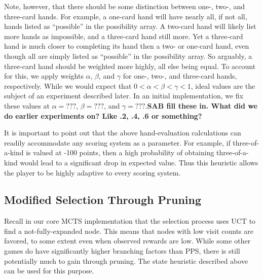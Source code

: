 \documentclass[letterpaper]{article}
\begin{document}
Note, however, that there should be some distinction between one-, two-, and three-card hands. For example, a one-card hand will have nearly all, if not all, hands listed as ``possible'' in the possibility array. A two-card hand will likely list more hands as impossible, and a three-card hand still more. Yet a three-card hand is much closer to completing its hand then a two- or one-card hand, even though all are simply listed as ``possible'' in the possibility array. So arguably, a three-card hand should be weighted more highly, all else being equal. To account for this, we apply weights $\alpha$, $\beta$, and $\gamma$ for one-, two-, and three-card hands, respectively. While we would expect that $0 < \alpha < \beta < \gamma < 1$, ideal values are the subject of an experiment described later. In an initial implementation, we fix these values at $\alpha = ???$, $\beta = ???$, and $\gamma = ???$.{\bf SAB fill these in. What did we do earlier experiments on? Like .2, .4, .6 or something?}


It is important to point out that the above hand-evaluation calculations can readily accommodate any scoring system as a parameter. For example, if three-of-a-kind is valued at -100 points, then a high probability of obtaining three-of-a-kind would lead to a significant drop in expected value. Thus this heuristic allows the player to be highly adaptive to every scoring system.

\subsection{Modified Selection Through Pruning}

Recall in our core MCTS implementation that the selection process uses UCT to find a not-fully-expanded node. This means that nodes with low visit counts are favored, to some extent even when observed rewards are low. While some other games do have significantly higher branching factors than PPS, there is still potentially much to gain through pruning. The state heuristic described above can be used for this purpose.
\end{document}
